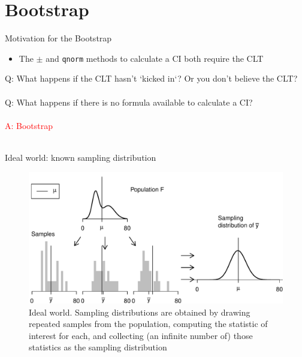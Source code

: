 \documentclass[10pt,handout]{beamer}\usepackage[]{graphicx}\usepackage[]{color}
\makeatletter
\def\maxwidth{ %
  \ifdim\Gin@nat@width>\linewidth
    \linewidth
  \else
    \Gin@nat@width
  \fi
}
\newenvironment{knitrout}{}{} %
\makeatother
\begin{document}
\section{Bootstrap}

\begin{frame}{Motivation for the Bootstrap}
	\begin{itemize}
		\setlength\itemsep{2em}
		\item The $\pm$ and \texttt{qnorm} methods to calculate a CI both require the CLT
	\end{itemize}
	
	\pause
	
	\vspace*{0.2in}
	
	\Large \textcolor{myblue}{Q: What happens if the CLT hasn't `kicked in`? Or you don't believe the CLT?} \\ \ \\
	\pause 
	\Large \textcolor{myblue}{Q: What happens if there is no formula available to calculate a CI?} \\ \ \\
	\pause 
	\Large \textcolor{red}{A: Bootstrap} \\ \ \\
\end{frame}



\begin{frame}[fragile]{Ideal world: known sampling distribution}
	
\begin{knitrout}\tiny
{}\color{fgcolor}\begin{figure}

{\centering \includegraphics[width=\maxwidth]{figure/unnamed-chunk-15-1} 

}

\caption{\scriptsize{Ideal world. Sampling distributions are obtained by drawing repeated samples from the population, computing the statistic of interest for each, and collecting (an infinite number of) those statistics as the sampling distribution}}\label{fig:unnamed-chunk-15}
\end{figure}


\end{knitrout}
	
\end{frame}
\end{document}
